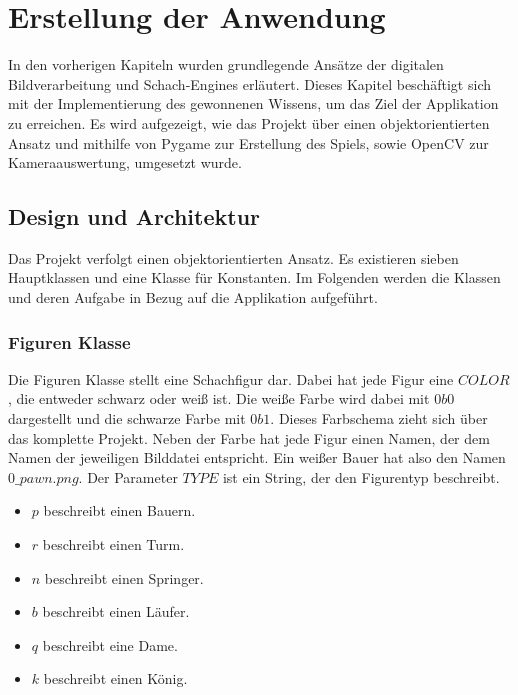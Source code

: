 
\chapter{Erstellung der Anwendung}
In den vorherigen Kapiteln wurden grundlegende Ansätze der digitalen Bildverarbeitung und Schach-Engines erläutert.
Dieses Kapitel beschäftigt sich mit der Implementierung des gewonnenen Wissens, um das Ziel der Applikation zu erreichen.  
Es wird aufgezeigt, wie das Projekt über einen objektorientierten Ansatz und mithilfe von Pygame zur 
Erstellung des Spiels, sowie OpenCV zur Kameraauswertung, umgesetzt wurde.

\section{Design und Architektur}
Das Projekt verfolgt einen objektorientierten Ansatz. Es existieren sieben Hauptklassen und eine Klasse für Konstanten.
Im Folgenden werden die Klassen und deren Aufgabe in Bezug auf die Applikation aufgeführt.

\subsection{Figuren Klasse}
Die Figuren Klasse stellt eine Schachfigur dar. Dabei hat jede Figur eine \(COLOR\), die entweder schwarz oder weiß ist.
Die weiße Farbe wird dabei mit \(0b0\) dargestellt und die schwarze Farbe mit \(0b1\). Dieses Farbschema zieht sich über das komplette Projekt.
Neben der Farbe hat jede Figur einen Namen, der dem Namen der jeweiligen Bilddatei entspricht. Ein weißer Bauer hat also den Namen \(0\_pawn.png \).  
Der Parameter \(TYPE\) ist ein String, der den Figurentyp beschreibt.

\begin{itemize}
    \item {\(p\) beschreibt einen Bauern.}
    \item {\(r\) beschreibt einen Turm.}
    \item {\(n\) beschreibt einen Springer.}
    \item {\(b\) beschreibt einen Läufer.}
    \item {\(q\) beschreibt eine Dame.}
    \item {\(k\) beschreibt einen König.}
\end{itemize}

